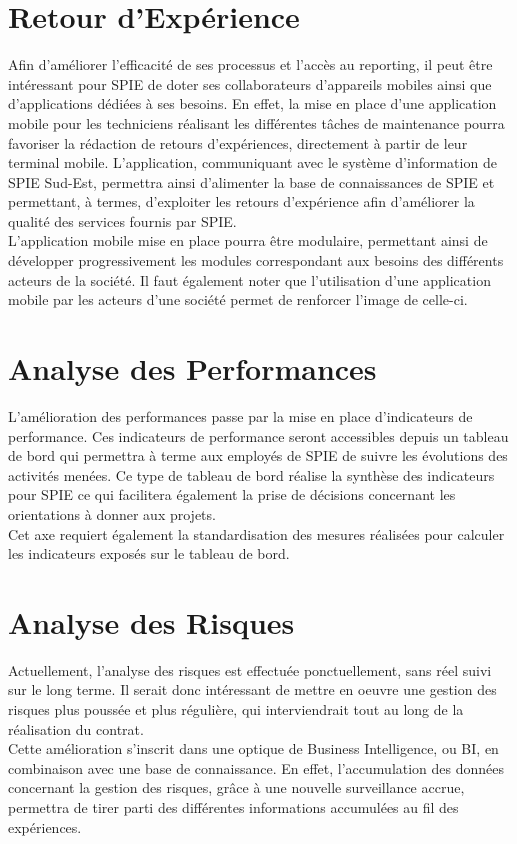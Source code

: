 \section{Retour d'Expérience}

Afin d’améliorer l’efficacité de ses processus et l’accès au reporting, il peut être intéressant pour SPIE de doter ses collaborateurs d’appareils mobiles ainsi que d’applications dédiées à ses besoins. En effet, la mise en place d’une application mobile pour les techniciens réalisant les différentes tâches de maintenance pourra favoriser la rédaction de retours d’expériences, directement à partir de leur terminal mobile. L’application, communiquant avec le système d’information de SPIE Sud-Est, permettra ainsi d’alimenter la base de connaissances de SPIE et permettant, à termes, d’exploiter les retours d’expérience afin d’améliorer la qualité des services fournis par SPIE. \\

L’application mobile mise en place pourra être modulaire, permettant ainsi de développer progressivement les modules correspondant aux besoins des différents acteurs de la société. Il faut également noter que l’utilisation d’une application mobile par les acteurs d’une société permet de renforcer l’image de celle-ci.

\section{Analyse des Performances}

L’amélioration des performances passe par la mise en place d’indicateurs de performance. Ces indicateurs de performance seront accessibles depuis un tableau de bord qui permettra à terme aux employés de SPIE de suivre les évolutions des activités menées. Ce type de tableau de bord réalise la synthèse des indicateurs pour SPIE ce qui facilitera également la prise de décisions concernant les orientations à donner aux projets. \\

Cet axe requiert également la standardisation des mesures réalisées pour calculer les indicateurs exposés sur le tableau de bord.

\section{Analyse des Risques}

Actuellement, l’analyse des risques est effectuée ponctuellement, sans réel suivi sur le long terme. Il serait donc intéressant de mettre en oeuvre une gestion des risques plus poussée et plus régulière, qui interviendrait tout au long de la réalisation du contrat. \\

Cette amélioration s’inscrit dans une optique de Business Intelligence, ou BI, en combinaison avec une base de connaissance. En effet, l’accumulation des données concernant la gestion des risques, grâce à une nouvelle surveillance accrue, permettra de tirer parti des différentes informations accumulées au fil des expériences.